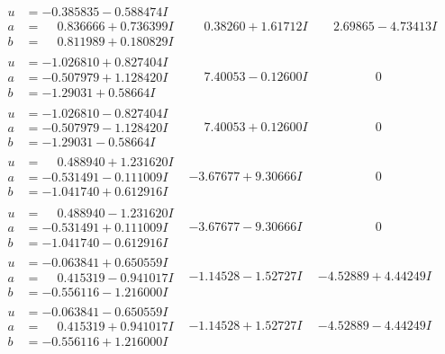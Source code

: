 \documentclass[1p]{elsarticle_modified}
\theoremstyle{definition}
\begin{document}
$$\begin{array}{c|c|c}
\begin{aligned}
u &= -0.385835 - 0.588474 I \\
a &= \phantom{-}0.836666 + 0.736399 I \\
b &= \phantom{-}0.811989 + 0.180829 I\end{aligned}
 & \phantom{-}0.38260 + 1.61712 I & \phantom{-}2.69865 - 4.73413 I \\ \hline\begin{aligned}
u &= -1.026810 + 0.827404 I \\
a &= -0.507979 + 1.128420 I \\
b &= -1.29031 + 0.58664 I\end{aligned}
 & \phantom{-}7.40053 - 0.12600 I & \phantom{-0.000000 } 0 \\ \hline\begin{aligned}
u &= -1.026810 - 0.827404 I \\
a &= -0.507979 - 1.128420 I \\
b &= -1.29031 - 0.58664 I\end{aligned}
 & \phantom{-}7.40053 + 0.12600 I & \phantom{-0.000000 } 0 \\ \hline\begin{aligned}
u &= \phantom{-}0.488940 + 1.231620 I \\
a &= -0.531491 - 0.111009 I \\
b &= -1.041740 + 0.612916 I\end{aligned}
 & -3.67677 + 9.30666 I & \phantom{-0.000000 } 0 \\ \hline\begin{aligned}
u &= \phantom{-}0.488940 - 1.231620 I \\
a &= -0.531491 + 0.111009 I \\
b &= -1.041740 - 0.612916 I\end{aligned}
 & -3.67677 - 9.30666 I & \phantom{-0.000000 } 0 \\ \hline\begin{aligned}
u &= -0.063841 + 0.650559 I \\
a &= \phantom{-}0.415319 - 0.941017 I \\
b &= -0.556116 - 1.216000 I\end{aligned}
 & -1.14528 - 1.52727 I & -4.52889 + 4.44249 I \\ \hline\begin{aligned}
u &= -0.063841 - 0.650559 I \\
a &= \phantom{-}0.415319 + 0.941017 I \\
b &= -0.556116 + 1.216000 I\end{aligned}
 & -1.14528 + 1.52727 I & -4.52889 - 4.44249 I \\ \hline\begin{aligned}

\end{aligned}
\end{array}$$
\end{document}
